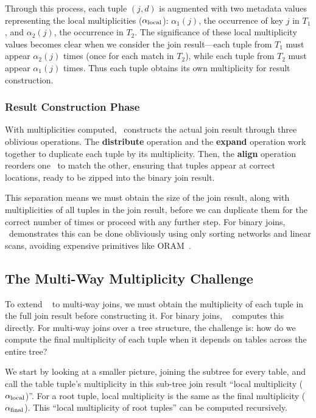 Through this process, each tuple $(j, d)$ is augmented with two metadata values representing the local multiplicities ($\alpha_{\text{local}}$): $\alpha_1(j)$, the occurrence of key $j$ in $T_1$, and $\alpha_2(j)$, the occurrence in $T_2$. The significance of these local multiplicity values becomes clear when we consider the join result---each tuple from $T_1$ must appear $\alpha_2(j)$ times (once for each match in $T_2$), while each tuple from $T_2$ must appear $\alpha_1(j)$ times. Thus each tuple obtains its own multiplicity for result construction.

\subsubsection{Result Construction Phase}

With multiplicities computed, \odbj\ constructs the actual join result through three oblivious operations. The \textbf{distribute} operation and the \textbf{expand} operation work together to duplicate each tuple by its multiplicity. Then, the \textbf{align} operation reorders one \expandedtable\ to match the other, ensuring that tuples appear at correct locations, ready to be zipped into the binary join result.

This separation means we must obtain the size of the join result, along with multiplicities of all tuples in the join result, before we can duplicate them for the correct number of times or proceed with any further step. For binary joins, \odbj\ demonstrates this can be done obliviously using only sorting networks and linear scans, avoiding expensive primitives like ORAM~\cite{goldreich1996}.

\subsection{The Multi-Way Multiplicity Challenge}

To extend \odbj~\cite{krastnikov2020} to multi-way joins, we must obtain the multiplicity of each tuple in the full join result before constructing it. For binary joins, \odbj~\cite{krastnikov2020} computes this directly. For multi-way joins over a tree structure, the challenge is: how do we compute the final multiplicity of each tuple when it depends on tables across the entire tree?

We start by looking at a smaller picture, joining the subtree for every table, and call the table tuple's multiplicity in this sub-tree join result ``local multiplicity ($\alpha_{\text{local}}$)''. For a root tuple, local multiplicity is the same as the final multiplicity ($\alpha_{\text{final}}$). This ``local multiplicity of root tuples'' can be computed recursively.

